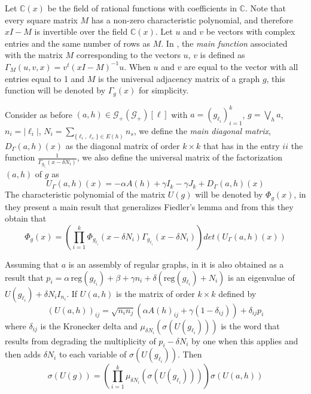 \documentclass[11pt]{article}
\theoremstyle{definition}
\begin{document}
Let $\mathbb{C}(x)$ be the field of rational functions with coefficients in $\mathbb{C}$. Note that every square matrix $M$ has a non-zero characteristic polynomial, and therefore $xI-M$ is invertible over the field $\mathbb{C}(x)$. Let $u$ and $v$ be vectors with complex entries and the same number of rows as $M$. In \cite{Saravanan2021}, the \textit{main function} associated with the matrix $M$ corresponding to the vectors $u$, $v$ is defined as $\Gamma_M(u, v, x)=v^t(xI-M)^{-1}u$. When $u$ and $v$ are equal to the vector with all entries equal to 1 and $M$ is the universal adjacency matrix of a graph $g$, this function will be denoted by $\Gamma_g(x)$ for simplicity.

Consider as before $(a, h)\in \mathscr{G}_+(\mathscr{G}_+)[\ell]$ with $a=(g_{\ell_i})^k_{i=1}$, $\displaystyle{g=\bigvee_{h}a}$, $n_i=|\ell_i|$, $\displaystyle{N_i=\sum_{\{\ell_i, \ell_s\}\in E(h)} n_s}$, we define the \emph{main diagonal matrix}, $D_{\Gamma}(a, h)(x)$ as the diagonal matrix of order $k\times k$ that has in the entry $ii$ the function $\frac{1}{\Gamma_{g_{\ell_i}}(x-\delta N_i)} $, we also define the universal matrix of the factorization $(a, h)$ of $g$ as \[U_{\Gamma}(a, h)(x)=-\alpha A(h)+ \gamma I_k-\gamma J_k+ D_{\Gamma}(a, h)(x)\] The characteristic polynomial of the matrix $U(g)$ will be denoted by $\Phi_g(x)$, in \cite{Saravanan2021} they present a main result that generalizes Fiedler's lemma and from this they obtain that
\begin{equation}\label{polinomialuni}
\Phi_g(x)=\left(\prod^k_{i=1}\Phi_{g_{\ell_i}}(x-\delta N_i)\Gamma_{g_{\ell_i}}(x-\delta N_i)\right)det(U_{\Gamma}(a, h)(x))
\end{equation}

Assuming that $a$ is an assembly of regular graphs, in \cite{Saravanan2021} it is also obtained as a result that $p_i=\alpha\,\mathrm{reg}(g_{\ell_i})+\beta+\gamma n_i+\delta(\mathrm{reg}(g_{\ell_i})+N_i)$ is an eigenvalue of $U(g_{\ell_i})+\delta N_i I_{n_i}$. If $U(a, h)$ is the matrix of order $k\times k$ defined by \[(U(a, h))_{ij}=\sqrt{n_in_j}(\alpha A(h)_{ij}+\gamma(1-\delta_{ij}))+ \delta_{ij}p_i\] where $\delta_{ij}$ is the Kronecker delta and $\mu_{\delta N_i}(\sigma(U(g_{\ell_i})))$ is the word that results from degrading the multiplicity of $p_i-\delta N_i$ by one when this applies and then adds $\delta N_i$ to each variable of $\sigma(U(g_{\ell_i}))$. Then
\begin{equation}\label{spectrauni}
\sigma(U(g))=\left(\prod^k_{i=1}\mu_{\delta N_i}(\sigma(U(g_{\ell_i})))\right)\sigma(U(a,h))
\end{equation}
\end{document}
